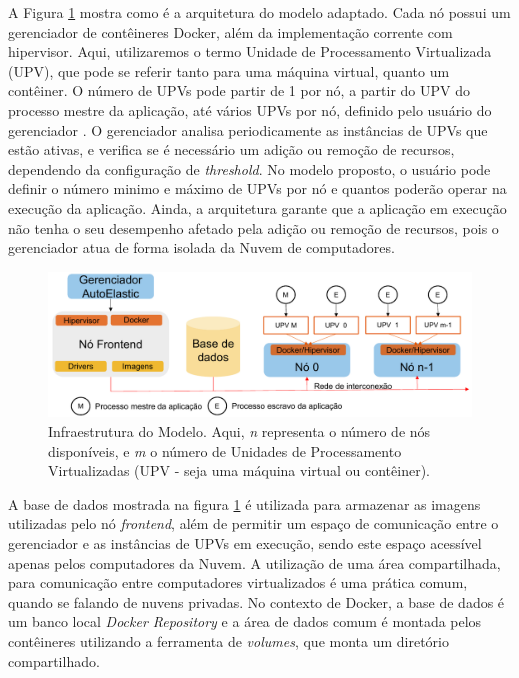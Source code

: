 \documentclass[twoside,english,brazilian]{UNISINOSartigo}
\begin{document}
A Figura \ref{fig:arquitetura} mostra como é a arquitetura do modelo adaptado. Cada nó possui um gerenciador de contêineres Docker, além da implementação corrente com hipervisor. Aqui, utilizaremos o termo Unidade de Processamento Virtualizada (UPV), que pode se referir tanto para uma máquina virtual, quanto um contêiner. O número de UPVs pode partir de 1 por nó, a partir do UPV do processo mestre da aplicação, até vários UPVs por nó, definido pelo usuário do gerenciador \cite{6307065}. O gerenciador analisa periodicamente as instâncias de UPVs que estão ativas, e verifica se é necessário um adição ou remoção de recursos, dependendo da configuração de \textit{threshold}. No modelo proposto, o usuário pode definir o número minimo e máximo de UPVs por nó e quantos poderão operar na execução da aplicação. Ainda, a arquitetura garante que a aplicação em execução não tenha o seu desempenho afetado pela adição ou remoção de recursos, pois o gerenciador atua de forma isolada da Nuvem de computadores. 
\begin{figure}[ht!]
	\caption{Infraestrutura do Modelo. Aqui, \textit{n} representa o número de nós disponíveis, e \textit{m} o número de Unidades de Processamento Virtualizadas (UPV - seja uma máquina virtual ou contêiner).}
	\label{fig:arquitetura}
	\centering%
	\begin{minipage}{0.8\textwidth}
		\includegraphics[width=\textwidth]{images/arquitetura}
	\end{minipage}
\end{figure}
A base de dados mostrada na figura \ref{fig:arquitetura} é utilizada para armazenar as imagens utilizadas pelo nó \textit{frontend}, além de permitir um espaço de comunicação entre o gerenciador e as instâncias de UPVs em execução, sendo este espaço acessível apenas pelos computadores da Nuvem. A utilização de uma área compartilhada, para comunicação entre computadores virtualizados é uma prática comum, quando se falando de nuvens privadas. No contexto de Docker, a base de dados é um banco local \textit{Docker Repository} e a área de dados comum é montada pelos contêineres utilizando a ferramenta de \textit{volumes}, que monta um diretório compartilhado.
\end{document}
